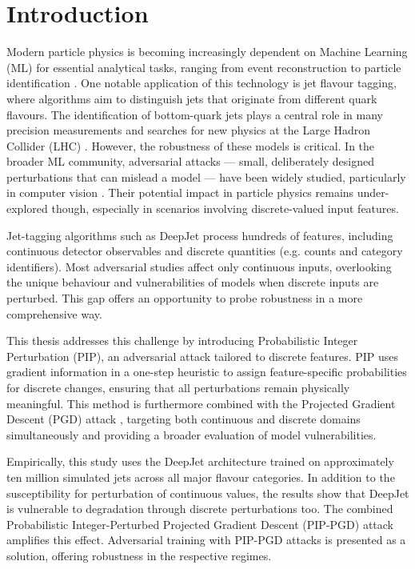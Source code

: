 \chapter{Introduction}

Modern particle physics is becoming increasingly dependent on Machine Learning (ML) for essential analytical tasks, ranging from event reconstruction to particle identification \cite{Stein2022}. One notable
application of this technology is jet flavour tagging, where algorithms aim to distinguish jets that originate
from different quark flavours. The identification of bottom-quark jets plays a central role in many precision measurements and searches for new physics at the Large Hadron Collider (LHC) \cite{PhysRevLett.121.121801}. However, the robustness of these models is critical. In the broader ML community, adversarial attacks — small, deliberately designed perturbations that can mislead a model — have been widely studied, particularly in computer vision \cite{goodfellow2015explainingharnessingadversarialexamples}. Their potential impact in particle physics remains under-explored though, especially in scenarios involving discrete-valued input features.

Jet-tagging algorithms such as DeepJet \cite{Bols_2020} process hundreds of features, including continuous detector observables and discrete quantities (e.g. counts and category identifiers). Most adversarial studies affect only continuous inputs, overlooking the unique behaviour and vulnerabilities of models when discrete inputs are perturbed. This gap offers an opportunity to probe robustness in a more comprehensive way.

This thesis addresses this challenge by introducing Probabilistic Integer Perturbation (PIP), an adversarial attack tailored to discrete features. PIP uses gradient information in a one-step heuristic to assign feature-specific probabilities for discrete changes, ensuring that all perturbations remain physically meaningful. This method is furthermore combined with the Projected Gradient Descent (PGD) attack \cite{madry2019deeplearningmodelsresistant}, targeting both continuous and discrete domains simultaneously and providing a broader evaluation of model vulnerabilities.

Empirically, this study uses the DeepJet architecture \cite{Bols_2020} trained on approximately ten million simulated jets across all major flavour categories. In addition to the susceptibility for perturbation of continuous values, the results show that DeepJet is vulnerable to degradation through discrete perturbations too. The combined Probabilistic Integer-Perturbed Projected Gradient Descent (PIP-PGD) attack amplifies this effect. Adversarial training with PIP-PGD attacks is presented as a solution, offering robustness in the respective regimes.

